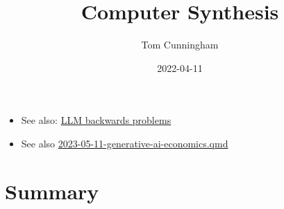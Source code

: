 \documentclass[
  11pt,
  letterpaper,
  DIV=11,
  numbers=noendperiod,
  oneside]{scrartcl}
\title{Computer Synthesis}
\author{Tom Cunningham}
\date{2022-04-11}
\providecommand{\tightlist}{%
  \setlength{\itemsep}{0pt}\setlength{\parskip}{0pt}}\usepackage{longtable,booktabs,array}
\begin{document}
\maketitle
\ifdefined\Shaded\renewenvironment{Shaded}{\begin{tcolorbox}[borderline west={3pt}{0pt}{shadecolor}, boxrule=0pt, sharp corners, frame hidden, breakable, interior hidden, enhanced]}{\end{tcolorbox}}\fi

\begin{itemize}
\tightlist
\item
  See also: \href{2023-04-20-llm-backwards-problems.qmd}{LLM backwards
  problems}
\item
  See also \url{2023-05-11-generative-ai-economics.qmd}
\end{itemize}

\hypertarget{summary}{%
\section{Summary}\label{summary}}
\end{document}
